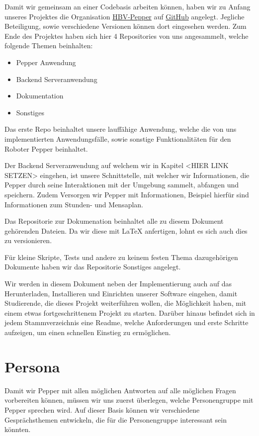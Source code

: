 Damit wir gemeinsam an einer Codebasis arbeiten können, haben wir zu Anfang unseres Projektes
die Organisation \href{https://github.com/ProjectPepperHSB}{HBV-Pepper} auf
\href{https://github.com}{GitHub} angelegt. Jegliche Beteiligung, sowie verschiedene Versionen können dort eingesehen werden.
Zum Ende des Projektes haben sich hier 4 Repositories von uns angesammelt, welche folgende Themen beinhalten:
\begin{itemize}
    \item Pepper Anwendung
    \item Backend Serveranwendung
    \item Dokumentation
    \item Sonstiges
\end{itemize}

Das erste Repo beinhaltet unsere lauffähige Anwendung, welche die von uns
implementierten Anwendungsfälle, sowie sonstige Funktionalitäten für den Roboter Pepper beinhaltet.

Der Backend Serveranwendung auf welchem wir in Kapitel <HIER LINK SETZEN> eingehen, ist unsere Schnittstelle, mit welcher wir
Informationen, die Pepper durch seine Interaktionen mit der Umgebung sammelt, abfangen und speichern. Zudem Versorgen wir
Pepper mit Informationen, Beispiel hierfür sind Informationen zum Stunden- und Mensaplan.

Das Repositorie zur Dokumenation beinhaltet alle zu diesem Dokument gehörenden Dateien. Da wir diese mit LaTeX anfertigen,
lohnt es sich auch dies zu versionieren.

Für kleine Skripte, Tests und andere zu keinem festen Thema dazugehörigen Dokumente haben wir das Repositorie
\grqq{}Sonstiges\grqq{} angelegt.

Wir werden in diesem Dokument neben der Implementierung auch auf das Herunterladen, Installieren und Einrichten
unserer Software eingehen, damit Studierende, die dieses Projekt weiterführen wollen, die Möglichkeit
haben, mit einem etwas fortgeschrittenem Projekt zu starten. Darüber hinaus befindet sich in jedem Stammverzeichnis
eine Readme, welche Anforderungen und erste Schritte aufzeigen, um einen schnellen Einstieg zu ermöglichen.

\section{Persona}
Damit wir Pepper mit allen möglichen Antworten auf alle möglichen Fragen vorbereiten können, müssen wir uns zuerst überlegen, welche Personengruppe mit Pepper sprechen wird. Auf dieser Basis können wir verschiedene Gesprächsthemen entwickeln, die für die Personengruppe interessant sein könnten.

